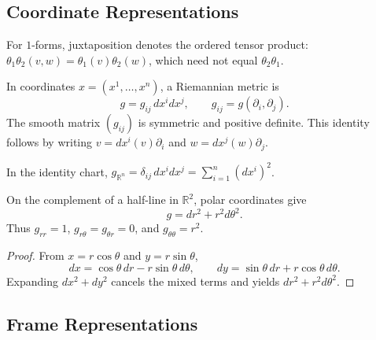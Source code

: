 \subsection{Coordinate Representations}

For $1$-forms, juxtaposition denotes the ordered tensor product:
$\theta_1\theta_2(v,w)=\theta_1(v)\theta_2(w)$, which need not equal
$\theta_2\theta_1$.

\begin{definition}
  \label{def:pet-ch1-coordinate-metric}
  \leanok
  In coordinates $x=(x^1,\ldots,x^n)$, a Riemannian metric is
  \[
    g=g_{ij}\,dx^i dx^j,
    \qquad g_{ij}=g(\partial_i,\partial_j).
  \]
  The smooth matrix $(g_{ij})$ is symmetric and positive definite. This identity
  follows by writing $v=dx^i(v)\partial_i$ and
  $w=dx^j(w)\partial_j$.
\end{definition}

\begin{example}
  \label{ex:pet-ch1-euclidean-coords}
  \leanok
  In the identity chart,
  $g_{\mathbb{R}^n}=\delta_{ij}\,dx^i dx^j=\sum_{i=1}^n(dx^i)^2$.
\end{example}

\begin{example}
  \label{ex:pet-ch1-polar-coords}
  \leanok
  On the complement of a half-line in $\mathbb{R}^2$, polar coordinates give
  \[
    g=dr^2+r^2d\theta^2.
  \]
  Thus $g_{rr}=1$, $g_{r\theta}=g_{\theta r}=0$, and
  $g_{\theta\theta}=r^2$.
\end{example}
\begin{proof}
  \leanok
  \sketch
  From $x=r\cos\theta$ and $y=r\sin\theta$,
  \[
    dx=\cos\theta\,dr-r\sin\theta\,d\theta,
    \qquad
    dy=\sin\theta\,dr+r\cos\theta\,d\theta.
  \]
  Expanding $dx^2+dy^2$ cancels the mixed terms and yields
  $dr^2+r^2d\theta^2$.
\end{proof}

\subsection{Frame Representations}

